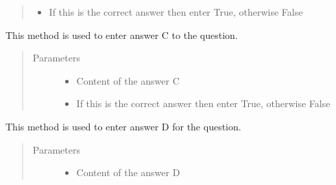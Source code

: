 \documentclass[letterpaper,10pt,english]{sphinxmanual}
\begin{document}
\begin{fulllineitems}
\begin{fulllineitems}
\begin{quote}
\begin{description}
\begin{itemize}
\item {} 
 \textendash{} If this is the correct answer then enter True, otherwise False

\end{itemize}

\end{description}\end{quote}

\end{fulllineitems}


\begin{fulllineitems}
\label{\detokenize{index:pytexexam.question.Question.answer_c}}
This method is used to enter answer C to the question.
\begin{quote}\begin{description}
\item[{Parameters}] \leavevmode\begin{itemize}
\item {} 
 \textendash{} Content of the answer C

\item {} 
 \textendash{} If this is the correct answer then enter True, otherwise False

\end{itemize}

\end{description}\end{quote}

\end{fulllineitems}


\begin{fulllineitems}
\label{\detokenize{index:pytexexam.question.Question.answer_d}}
This method is used to enter answer D for the question.
\begin{quote}\begin{description}
\item[{Parameters}] \leavevmode\begin{itemize}
\item {} 
 \textendash{} Content of the answer D


\end{itemize}
\end{description}
\end{quote}
\end{fulllineitems}
\end{fulllineitems}
\end{document}
